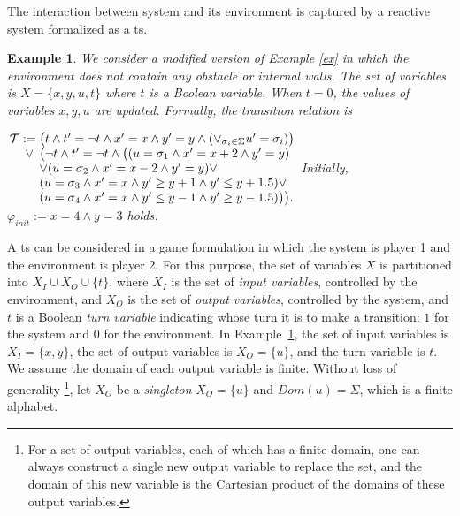 \documentclass[letterpaper, 10 pt, conference]{ieeeconf}
\newtheorem{example}{Example}
\begin{document}
The interaction between system and its environment is captured by a
reactive system formalized as a \ac{ts}.  
  \begin{example}
\label{ex2}
    We consider a modified version of Example \ref{ex} in which the
    environment does not contain any obstacle or internal walls.
    The set of variables is $X= \{x,y, u, t\}$ where $t$ is a
    Boolean variable. When $t=0$, the values of variables $x,y,u$ 
    are updated. Formally,  the transition relation is


$\arraycolsep=1.4pt
\begin{array}{rcl}
  \mathcal{T} & : = &  \big( t \land  t' = \neg t \land x'= x \land y'= y \land (\lor_{\sigma_i \in \Sigma} u'=\sigma_i ) \big)\\ 
              & \lor & \big( \neg t  \land  t' = \neg t  
              \land \big( ( u= \sigma_1 \land x'=x+2 \land y'=y ) \\&
&                              \lor    ( u= \sigma_2 \land x'=x-2 \land y'=y ) \lor \\&&
                                    ( u= \sigma_3 \land x'=x \land y' \ge y+1 \land y' \le y+1.5) \lor \\&&
                                   ( u= \sigma_4
                                \land x'=x \land y'\le y- 1 \land y'\ge y-1.5) \big)\big).  
\end{array}
$
Initially, $\varphi_{init}:= x=4 \land y= 3$ holds.
  \end{example}
  A \ac{ts} can be considered in a game formulation in which the
  system is player 1 and the environment is player 2. For this
  purpose, the set of variables $X$ is partitioned into $X_I \cup X_O
  \cup\{t\}$, where $X_I$ is the set of \emph{input variables},
  controlled by the environment, and $X_O$ is the set of
  \emph{output variables}, controlled by the system, and $t$ is a
  Boolean \emph{turn variable} indicating whose turn it is to make a transition:
  $1$ for the system and $0$ for the environment.  In
  Example~\ref{ex2}, the set of input variables is $X_I=\{x,y\} $, the
  set of output variables is $X_O=\{u \}$, and the turn variable is
  $t$.  We assume the domain of each output variable
  is finite. Without loss of generality \footnote{For a set of output
    variables, each of which has a finite domain, one can always
    construct a single new output variable to replace the set, and the
    domain of this new variable is the Cartesian product of the
    domains of these output variables.}, let $X_O$ be a
  \emph{singleton} $X_O=\{u\}$ and $Dom(u)= \Sigma$, which is a finite
  alphabet.
\end{document}
